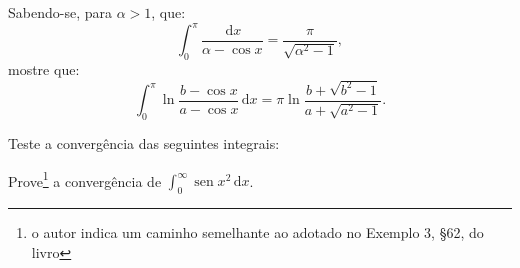 \documentclass[11pt, a5paper]{exam}
\DeclareMathOperator{\sen}{sen}
\newcommand{\dd}{\,\mathrm{d}}
\begin{document}
\begin{questions}
\question 
Sabendo-se, para $ \alpha > 1 $, que:
\[
  \int_{0}^{\pi} \frac{\dd{x}}{\alpha - \cos{x}} = \frac{\pi}{\sqrt{\alpha^2 -1}},
\]
mostre que:
\[
  \int_{0}^{\pi} \ln{\frac{b - \cos{x}}{a - \cos{x}}} \dd{x} = \pi \ln{\frac{b + \sqrt{b^2 -1}}{a + \sqrt{a^2 -1}}}.
\]

\question 
Teste a convergência das seguintes integrais:
\begin{multicols}{2}
\end{multicols}

\question 
Prove\footnote{o autor indica um caminho semelhante ao adotado no Exemplo 3, \S 62, do livro} 
a convergência de $ \displaystyle \int_{0}^{\infty} \sen{x^2} \dd{x} $.


\end{questions}
\end{document}
